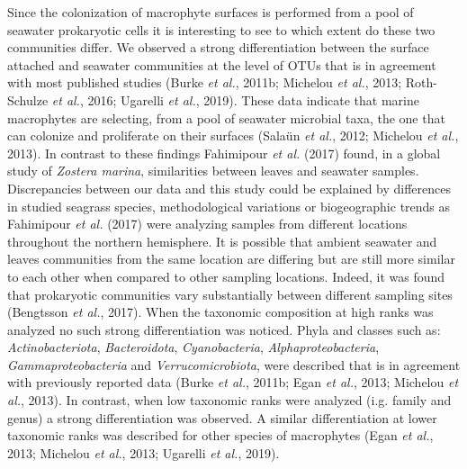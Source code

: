 \documentclass[12pt,]{article}
\begin{document}
Since the colonization of macrophyte surfaces is performed from a pool
of seawater prokaryotic cells it is interesting to see to which extent
do these two communities differ. We observed a strong differentiation
between the surface attached and seawater communities at the level of
OTUs that is in agreement with most published studies (Burke \emph{et
al.}, 2011b; Michelou \emph{et al.}, 2013; Roth-Schulze \emph{et al.},
2016; Ugarelli \emph{et al.}, 2019). These data indicate that marine
macrophytes are selecting, from a pool of seawater microbial taxa, the
one that can colonize and proliferate on their surfaces (Salaün \emph{et
al.}, 2012; Michelou \emph{et al.}, 2013). In contrast to these findings
Fahimipour \emph{et al.} (2017) found, in a global study of
\emph{Zostera marina}, similarities between leaves and seawater samples.
Discrepancies between our data and this study could be explained by
differences in studied seagrass species, methodological variations or
biogeographic trends as Fahimipour \emph{et al.} (2017) were analyzing
samples from different locations throughout the northern hemisphere. It
is possible that ambient seawater and leaves communities from the same
location are differing but are still more similar to each other when
compared to other sampling locations. Indeed, it was found that
prokaryotic communities vary substantially between different sampling
sites (Bengtsson \emph{et al.}, 2017). When the taxonomic composition at
high ranks was analyzed no such strong differentiation was noticed.
Phyla and classes such as: \emph{Actinobacteriota}, \emph{Bacteroidota},
\emph{Cyanobacteria}, \emph{Alphaproteobacteria},
\emph{Gammaproteobacteria} and \emph{Verrucomicrobiota}, were described
that is in agreement with previously reported data (Burke \emph{et al.},
2011b; Egan \emph{et al.}, 2013; Michelou \emph{et al.}, 2013). In
contrast, when low taxonomic ranks were analyzed (i.g. family and genus)
a strong differentiation was observed. A similar differentiation at
lower taxonomic ranks was described for other species of macrophytes
(Egan \emph{et al.}, 2013; Michelou \emph{et al.}, 2013; Ugarelli
\emph{et al.}, 2019).
\end{document}
